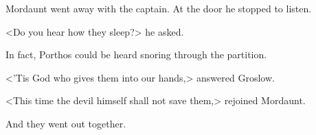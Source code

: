 Mordaunt went away with the captain. At the door he stopped to listen.

<Do you hear how they sleep?> he asked.

In fact, Porthos could be heard snoring through the partition.

<'Tis God who gives them into our hands,> answered Groslow.

<This time the devil himself shall not save them,> rejoined Mordaunt.

And they went out together. 